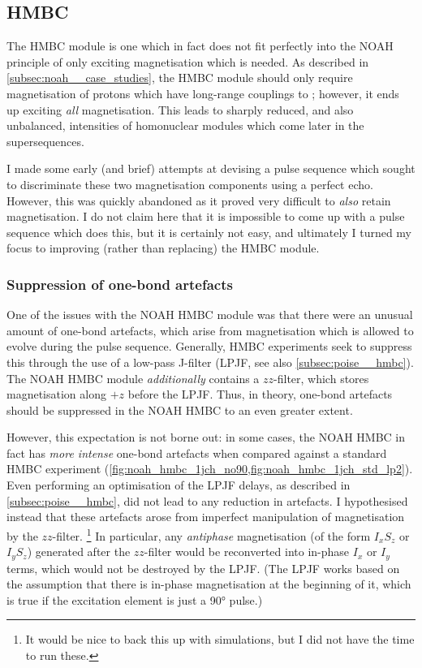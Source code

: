 \subsection{HMBC}
\label{subsec:noah__hmbc}

The HMBC module is one which in fact does not fit perfectly into the NOAH principle of only exciting magnetisation which is needed.
As described in \cref{subsec:noah__case_studies}, the HMBC module should only require magnetisation of protons which have long-range couplings to \carbon{}; however, it ends up exciting \textit{all}  magnetisation.
This leads to sharply reduced, and also unbalanced, intensities of homonuclear modules which come later in the supersequences.

I made some early (and brief) attempts at devising a pulse sequence which sought to discriminate these two magnetisation components using a perfect echo\autocite{Parella2019MRC}.
However, this was quickly abandoned as it proved very difficult to \textit{also} retain  magnetisation.
I do not claim here that it is impossible to come up with a pulse sequence which does this, but it is certainly not easy, and ultimately I turned my focus to improving (rather than replacing) the HMBC module.


\subsubsection{Suppression of one-bond artefacts}

One of the issues with the NOAH HMBC module was that there were an unusual amount of one-bond artefacts, which arise from  magnetisation which is allowed to evolve during the pulse sequence.
Generally, HMBC experiments seek to suppress this through the use of a low-pass J-filter (LPJF, see also \cref{subsec:poise__hmbc}).
The NOAH HMBC module \textit{additionally} contains a $zz$-filter, which stores  magnetisation along $+z$ before the LPJF.
Thus, in theory, one-bond artefacts should be suppressed in the NOAH HMBC to an even greater extent.

However, this expectation is not borne out: in some cases, the NOAH HMBC in fact has \textit{more intense} one-bond artefacts when compared against a standard HMBC experiment (\cref{fig:noah_hmbc_1jch_no90,fig:noah_hmbc_1jch_std_lp2}).
Even performing an optimisation of the LPJF delays, as described in \cref{subsec:poise__hmbc}, did not lead to any reduction in artefacts.
I hypothesised instead that these artefacts arose from imperfect manipulation of  magnetisation by the $zz$-filter.%
\footnote{It would be nice to back this up with simulations, but I did not have the time to run these.}
In particular, any \textit{antiphase} magnetisation (of the form $I_xS_z$ or $I_yS_z$) generated after the $zz$-filter would be reconverted into in-phase $I_x$ or $I_y$ terms, which would not be destroyed by the LPJF.
(The LPJF works based on the assumption that there is in-phase magnetisation at the beginning of it, which is true if the excitation element is just a \proton{} \ang{90} pulse.)

